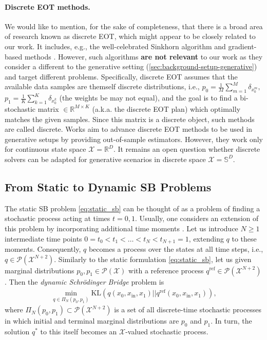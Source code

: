 \paragraph{Discrete EOT methods.} We would like to mention, for the sake of completeness, that there is a broad area of research known as discrete EOT, which might appear to be closely related to our work. It includes, e.g., the well-celebrated Sinkhorn algorithm \citep{cuturi2013sinkhorn} and gradient-based methods \cite{dvurechensky2018computational,dvurechenskii2018decentralize}. However, such algorithms \textbf{are not relevant} to our work as they consider a different to the generative setting (\wasyparagraph\ref{sec:background-setup-generative}) and target different problems. Specifically, discrete EOT assumes that the available data samples are themself discrete distributions, i.e., $p_0 =\frac{1}{M}\sum^M_{m=1}\delta_{x_0^m},$ $p_1 = \frac{1}{K}\sum^K_{k=1}\delta_{x^k_0}$ (the weights be may not equal), and the goal is to find a bi-stochastic matrix $\in\mathbb{R}^{M\times K}$ (a.k.a. the discrete EOT plan) which optimally matches the given samples. Since this matrix is a discrete object, such methods are called discrete. Works \citep{hutter2021minimax, pooladian2021entropic, manole2021plugin, deb2021rates} aim to advance discrete EOT methods to be used in generative setups by providing out-of-sample estimators. However, they work only for continuous state space $\mathcal{X}=\mathbb{R}^{D}$. It remains an open question whether discrete solvers can be adapted for generative scenarios in discrete space $\mathcal{X}=\mathbb{S}^{D}$.

\subsection{From Static to Dynamic SB Problems}
The static SB problem \eqref{eq:static_sb} can be thought of as a problem of finding a stochastic process acting at times $t=0,1$. Usually, one considers an extension of this problem by incorporating additional time moments \cite{de2021diffusion,gushchin2024adversarial}. Let us introduce $N \geq 1$ intermediate time points $0 = t_0 < t_1 < \dots < t_N < t_{N+1} = 1$, extending $q$ to these moments. Consequently, $q$ becomes a process over the states at all time steps, i.e., $q \in \mathcal{P}(\mathcal{X}^{N+2})$. Similarly to the static formulation \eqref{eq:static_sb}, let us given marginal distributions $p_0,p_1 \in \mathcal{P}(\mathcal{X})$ with a reference process $q^{\text{ref}}\in\mathcal{P}(\mathcal{X}^{N+2})$. Then the \emph{dynamic Schrödinger Bridge} problem is
\begin{multline}
    \label{eq:disc_dyn_sb}
    \min_{q \in \Pi_{N}(p_0, p_1)}\text{KL}(q(x_0, x_{\text{in}}, x_1)||q^{\text{ref}}(x_0, x_{\text{in}}, x_1)),
\end{multline}
where $\Pi_{N}(p_0, p_1) \subset \mathcal{P}(\mathcal{X}^{N+2})$ is a set of all discrete-time stochastic processes in which initial and terminal marginal distributions are $p_0$ and $p_1$. In turn, the solution $q^{*}$ to this itself becomes an $\mathcal{X}$-valued stochastic process.

